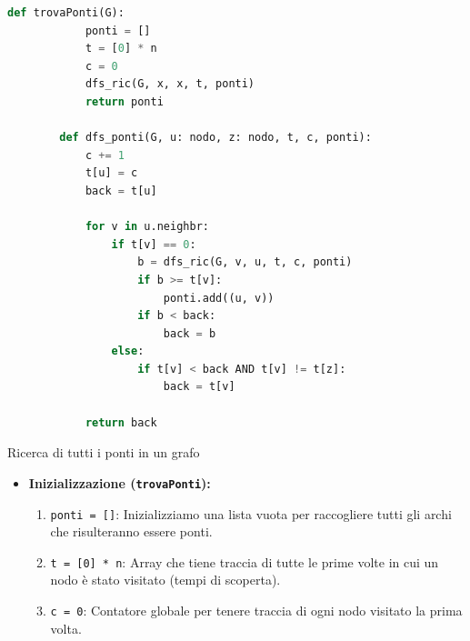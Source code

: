 \documentclass[12pt]{report}
\begin{document}
	\begin{lstlisting}[style=stile-listings, language=Python, caption={Algoritmo per la ricerca dei ponti in un grafo.}]
		def trovaPonti(G):
			ponti = []
			t = [0] * n
			c = 0
			dfs_ric(G, x, x, t, ponti)
			return ponti
			
		def dfs_ponti(G, u: nodo, z: nodo, t, c, ponti):
			c += 1
			t[u] = c
			back = t[u]
			
			for v in u.neighbr:
				if t[v] == 0:
					b = dfs_ric(G, v, u, t, c, ponti)
					if b >= t[v]:
						ponti.add((u, v))
					if b < back:
						back = b
				else:
					if t[v] < back AND t[v] != t[z]:
						back = t[v]
			
			return back
	\end{lstlisting}
	
	\begin{algoritmo}{Ricerca di tutti i ponti in un grafo}{}
		\begin{itemize}
			\item \textbf{Inizializzazione (\texttt{trovaPonti}):}
			\begin{enumerate}
				\item \texttt{ponti = []}: Inizializziamo una lista vuota per raccogliere tutti gli archi che risulteranno essere ponti.
				\item \texttt{t = [0] * n}: Array che tiene traccia di tutte le prime volte in cui un nodo è stato visitato (tempi di scoperta).
				\item \texttt{c = 0}: Contatore globale per tenere traccia di ogni nodo visitato la prima volta.
			\end{enumerate}
			

\end{itemize}
\end{algoritmo}
\end{document}

